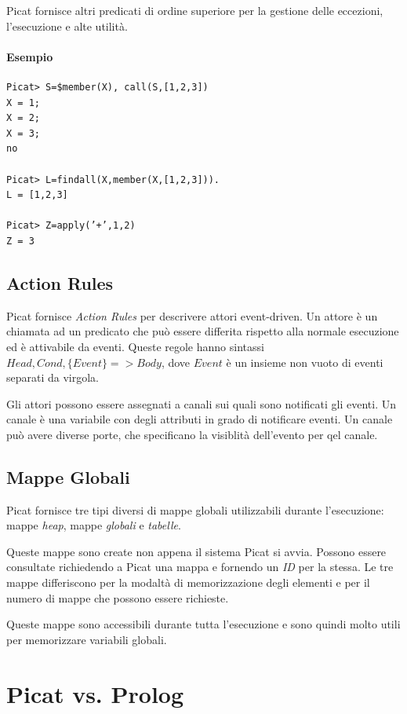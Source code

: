 \documentclass[12pt,a4paper,openright]{book} %
\begin{document}
Picat fornisce altri predicati di ordine superiore per la gestione delle eccezioni, l'esecuzione e alte utilità.

\paragraph{Esempio}
\begin{verbatim}
Picat> S=$member(X), call(S,[1,2,3])
X = 1;
X = 2;
X = 3;
no

Picat> L=findall(X,member(X,[1,2,3])).
L = [1,2,3]

Picat> Z=apply(’+’,1,2)
Z = 3
\end{verbatim}

\subsection{Action Rules}
\label{sec:picat_advanced_actionrules}

Picat fornisce \emph{Action Rules} per descrivere attori event-driven. Un attore è un chiamata ad un predicato che può essere differita rispetto alla normale esecuzione ed è attivabile da eventi. Queste regole hanno sintassi $Head, Cond, \{Event\} => Body$, dove $Event$ è un insieme non vuoto di eventi separati da virgola.

Gli attori possono essere assegnati a canali sui quali sono notificati gli eventi. Un canale è una variabile con degli attributi in grado di notificare eventi. Un canale può avere diverse porte, che specificano la visiblità dell'evento per qel canale. 

\subsection{Mappe Globali}
\label{sec:picat_advanced_globalmaps}

Picat fornisce tre tipi diversi di mappe globali utilizzabili durante l'esecuzione: mappe \emph{heap}, mappe \emph{globali} e \emph{tabelle}.

Queste mappe sono create non appena il sistema Picat si avvia. Possono essere consultate richiedendo a Picat una mappa e fornendo un \emph{ID} per la stessa. Le tre mappe differiscono per la modaltà di memorizzazione degli elementi e per il numero di mappe che possono essere richieste.

Queste mappe sono accessibili durante tutta l'esecuzione e sono quindi molto utili per memorizzare variabili globali.

\section{Picat vs. Prolog}
\label{sec:picat_picatvsprolog}
\end{document}
